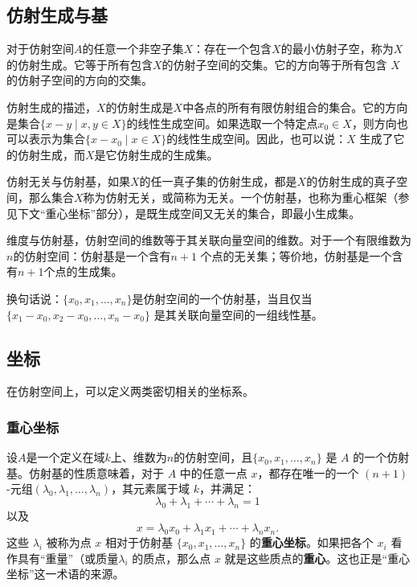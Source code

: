 \subsection{仿射生成与基}
对于仿射空间$A$的任意一个非空子集$X$：存在一个包含$X$的最小仿射子空，称为$X$的仿射生成。它等于所有包含$X$的仿射子空间的交集。它的方向等于所有包含 $X$ 的仿射子空间的方向的交集。

仿射生成的描述，$X$的仿射生成是$X$中各点的所有有限仿射组合的集合。它的方向是集合$\{x - y \mid x, y \in X\}$的线性生成空间。如果选取一个特定点$x_0 \in X$，则方向也可以表示为集合$\{x - x_0 \mid x \in X\}$的线性生成空间。因此，也可以说：$X$ 生成了它的仿射生成，而$X$是它仿射生成的生成集。

仿射无关与仿射基，如果$X$的任一真子集的仿射生成，都是$X$的仿射生成的真子空间，那么集合$X$称为仿射无关，或简称为无关。一个仿射基，也称为重心框架（参见下文“重心坐标”部分），是既生成空间又无关的集合，即最小生成集。

维度与仿射基，仿射空间的维数等于其关联向量空间的维数。对于一个有限维数为$n$的仿射空间：仿射基是一个含有$n+1$ 个点的无关集；等价地，仿射基是一个含有$n+1$个点的生成集。

换句话说：$\{x_0, x_1, \ldots, x_n\}$是仿射空间的一个仿射基，当且仅当$\{x_1 - x_0, x_2 - x_0, \ldots, x_n - x_0\}$ 是其关联向量空间的一组线性基。
\subsection{坐标}
在仿射空间上，可以定义两类密切相关的坐标系。
\subsubsection{重心坐标}
设$A$是一个定义在域$k$上、维数为$n$的仿射空间，且$\{x_0, x_1, \dots, x_n\}$ 是 $A$ 的一个仿射基。仿射基的性质意味着，对于 $A$ 中的任意一点 $x$，都存在唯一的一个 $(n+1)$-元组$(\lambda_0, \lambda_1, \dots, \lambda_n)$，其元素属于域 $k$，并满足：
$$
\lambda_0 + \lambda_1 + \cdots + \lambda_n = 1~
$$
以及
$$
x = \lambda_0 x_0 + \lambda_1 x_1 + \cdots + \lambda_n x_n.~
$$
这些 $\lambda_i$ 被称为点 $x$ 相对于仿射基 $\{x_0, x_1, \dots, x_n\}$ 的\textbf{重心坐标}。如果把各个 $x_i$ 看作具有“重量”（或质量$\lambda_i$ 的质点，那么点 $x$ 就是这些质点的\textbf{重心}。这也正是“重心坐标”这一术语的来源。

